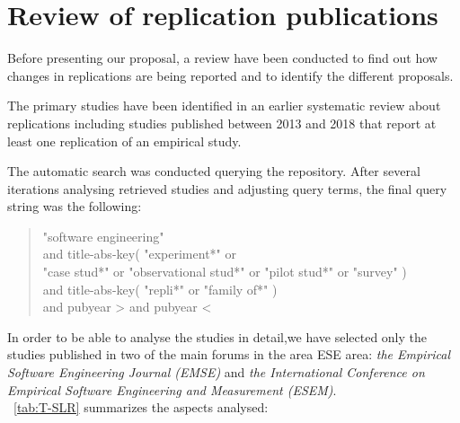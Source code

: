 
\section{Review of replication publications }
\label{sec:SLR}

Before presenting our proposal, a review have been conducted to find out how changes in replications are being reported and to identify the different proposals.

The primary studies have been identified in an earlier systematic review about replications  \cite{cruz2019replication} including studies published between 2013 and 2018 that report at least one replication of an empirical study.

The automatic search was conducted querying the \SCOPUS repository. %
After several iterations analysing retrieved studies and adjusting query terms, the final query string was the following:

\begin{quote}
"software engineering" \\ and  title-abs-key( "experiment*"  or \\  "case stud*" or "observational stud*" or "pilot stud*" or "survey" ) \\ and title-abs-key( 
"repli*" or "family of*" ) \\ and  
 pubyear \textgreater  {} and pubyear \textless  {}

\end{quote}

In order to be able to analyse the studies in detail,we have selected only the studies published in two of the main forums in the area \gls{ESE} area: \emph{the Empirical Software Engineering Journal (EMSE)} and \emph{the International Conference on Empirical Software Engineering and Measurement (ESEM)}.\\

\tablename~\ref{tab:T-SLR} summarizes the aspects analysed:


